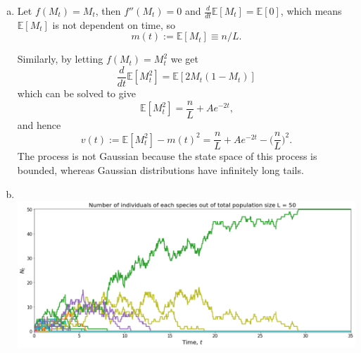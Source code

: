 \documentclass[12pt, twoside, a4paper]{article}
\begin{document}
\begin{enumerate}[a)]
\item
Let $f(M_t) = M_t$, then $f''(M_t) = 0$ and $\frac{d}{dt} \mathbb{E} [M_t] = \mathbb{E} [0]$, which means $\mathbb{E} [M_t]$ is not dependent on time, so 
\[
m(t) := \mathbb{E} [M_t] \equiv n/L \text{.}
\]

Similarly, by letting $f(M_t) = M_t^2$ we get 
\[
\frac{d}{dt} \mathbb{E} [M_t^2] = \mathbb{E} [2M_t (1-M_t)]
\]
which can be solved to give 
\[
\mathbb{E} [M_t^2] = \frac{n}{L} + Ae^{-2t} \text{,}
\]
and hence 
\[
v(t) := \mathbb{E} [M_t^2] - m(t)^2 = \frac{n}{L} + Ae^{-2t} - \bigg( \frac{n}{L} \bigg) ^2 \text{.}
\]
The process is not Gaussian because the state space of this process is bounded, whereas Gaussian distributions have infinitely long tails. 

\vspace{10mm}

\item 
\text{}\\
\hspace*{-2cm}
\includegraphics[width = 190mm]{moran}

\end{enumerate}
\end{document}
